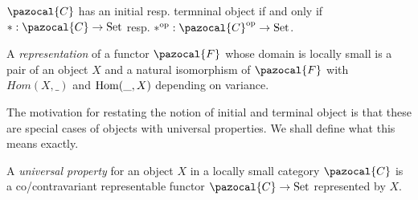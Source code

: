 \begin{remark}
    $\pazocal{C}$ has an initial resp. termninal object if and only if $\ast : \pazocal{C}\rightarrow \mathrm{Set}$ resp. $\ast\op: \pazocal{C}\op \rightarrow \mathrm{Set}$.  
\end{remark}
\begin{definition}
    A \emph{representation} of a functor $\pazocal{F}$ whose domain is locally small is a pair of an object $X$ and a natural isomorphism of $\pazocal{F}$ with $Hom(X,\_)$ and $\mathrm{Hom}(\_,X)$ depending on variance. 
\end{definition}
The motivation for restating the notion of initial and terminal object is that these are special cases of objects with universal properties. We shall define what this means exactly.
\begin{definition}
    A \emph{universal property} for an object $X$ in a locally small category $\pazocal{C}$ is a co/contravariant representable functor $\pazocal{C}\rightarrow \mathrm{Set}$ represented by $X$. 
\end{definition}
